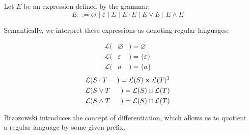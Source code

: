 \documentclass[sigplan,review,acmsmall,nonacm,screen,anonymous]{acmart}\settopmatter{printfolios=false,printccs=false,printacmref=false}
\begin{document}
  \begin{definition}
    Let \( E \) be an expression defined by the grammar:
    \[
      E ::= \varnothing \mid \varepsilon \mid \Sigma \mid E \cdot E \mid E \lor E \mid E \land E
    \]

    Semantically, we interpret these expressions as denoting regular languages:
    \setlength{\columnseprule}{0pt}
    \setlength{\columnsep}{-3cm}
    \begin{multicols}{2}
      \begin{eqnarray*}
        \mathcal{L}(& \varnothing & ) = \varnothing \\
        \mathcal{L}(& \varepsilon & ) = \{\varepsilon\} \\
        \mathcal{L}(& a           & ) = \{a\}
      \end{eqnarray*} \break\vspace{-0.45cm}
      \begin{eqnarray*}
        \mathcal{L}(& S\cdot T    & ) = \mathcal{L}(S) \times \mathcal{L}(T)\text{\footnotemark}\\
        \mathcal{L}(& S\vee  T    & ) = \mathcal{L}(S) \cup \mathcal{L}(T)\\
        \mathcal{L}(& S\land T    & ) = \mathcal{L}(S) \cap \mathcal{L}(T)
      \end{eqnarray*}
    \end{multicols}
  \end{definition}

  Brzozowski introduces the concept of differentiation, which allows us to quotient a regular language by some given prefix.
\end{document}
